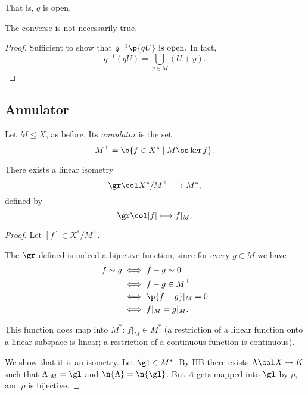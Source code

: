 That is, $q$ is open.

\begin{remark}
  The converse is not necessarily true.  
\end{remark}

\begin{proof}
  Sufficient to show that
  $ \text{$q^{-1}\p{qU}$ is open}. $
  In fact,
  $$ q^{-1}(qU) = \bigcup_{y \in M}(U+y). $$
\end{proof}

\subsection{Annulator}

\begin{definition}
  Let $M \le X$, as before.
  Its \emph{annulator} is the set
  $$ M^\perp = \b{f \in X^* \mid M \ss \ker f}. $$
\end{definition}

\begin{theorem}
  There exists a linear isometry
  $$ \gr \col X^*/M^\perp \longrightarrow M^*, $$
  defined by
  $$ \gr \col [f] \longmapsto f|_M. $$
\end{theorem}

\begin{proof}
  Let $[f] \in X^*/M^\perp$.
  
  The $\gr$ defined is indeed a bijective function, since
  for every $g \in M$ we have
  \begin{align*}
    f \sim g
    &\iff f-g \sim 0 \\
    &\iff f-g \in M^\perp \\
    &\iff \p{f-g}|_M =0 \\
    &\iff f|_M = g|_M.
  \end{align*}

  This function does map into $M^*$:
  $f|_M \in M^*$ (a restriction of a linear function onto a linear subspace is linear; a restriction of a continuous function is continuous).
  
  We show that it is an isometry.
  Let $\gl \in M^*$. By HB there exists $\Lambda \col X \to K$ such that $\Lambda|_M = \gl$ and $\n{\Lambda} = \n{\gl}$. But $\Lambda$ gets mapped into $\gl$ by $\rho$, and $\rho$ is bijective.
\end{proof}


